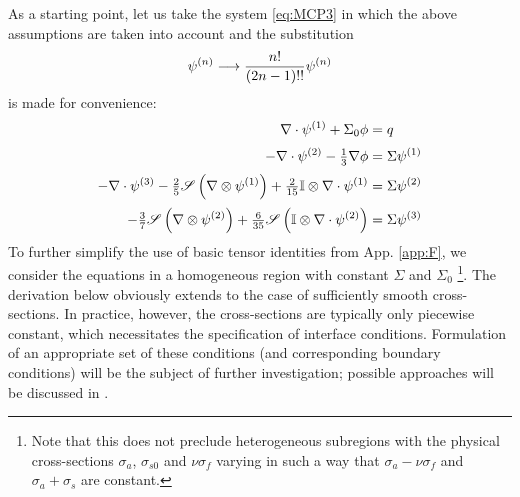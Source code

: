 As a starting point, let us take the system \eqref{eq:MCP3} in which the above assumptions are taken into account and
the substitution 
$$
	\fmom[n] \longrightarrow \frac{n!}{(2n-1)!!} \fmom[n]
$$
is made for convenience:
\begin{align}
    \div\fmom[1] +   {\Sigma}_{0}\phi
  	  &=  q 				\label{eq:MCP3_1}  \\[.2em]
    -\div\fmom[2] - \tfrac13\del\phi     
      &=  \Sigma\fmom[1]	\label{eq:MCP3_2}  \\[.2em]
    -\div\fmom[3] - \tfrac25\Sym{\del\otimes\fmom[1]} + \tfrac{2}{15} \eye\otimes\div\fmom[1]
      &=  \Sigma\fmom[2]  	\label{eq:MCP3_3}  \\[.2em]
                         - \tfrac{3}{7}\Sym{\del\otimes\fmom[2]} + \tfrac{6}{35} \Sym{\eye\otimes\div\fmom[2]}
      &=  \Sigma\fmom[3]	\label{eq:MCP3_4}
\end{align}
To further simplify the use of basic tensor identities from App. \ref{app:F}, we consider the equations in a
homogeneous region with constant $\Sigma$ and $\Sigma_0$ \footnote{Note that
this does not preclude heterogeneous subregions with the physical cross-sections $\sigma_a$, $\sigma_{s0}$ and
$\nu\sigma_f$ varying in such a way that $\sigma_a - \nu\sigma_f$ and $\sigma_a + \sigma_s$ are constant.}.
The derivation below obviously extends to the case of sufficiently smooth cross-sections. In practice, however, the 
cross-sections are typically only piecewise constant, which necessitates the specification of interface conditions. 
Formulation of an appropriate set of these conditions (and corresponding boundary conditions) will be the subject of 
further investigation; possible approaches will be discussed in .

